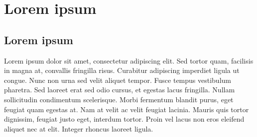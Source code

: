 \chapter{Lorem ipsum}

\section{Lorem ipsum}
Lorem ipsum dolor sit amet, consectetur adipiscing elit. Sed tortor quam, facilisis in magna at, convallis fringilla risus. Curabitur adipiscing imperdiet ligula ut congue. Nunc non urna sed velit aliquet tempor. Fusce tempus vestibulum pharetra. Sed laoreet erat sed odio cursus, et egestas lacus fringilla. Nullam sollicitudin condimentum scelerisque. Morbi fermentum blandit purus, eget feugiat quam egestas at. Nam at velit ac velit feugiat lacinia. Mauris quis tortor dignissim, feugiat justo eget, interdum tortor. Proin vel lacus non eros eleifend aliquet nec at elit. Integer rhoncus laoreet ligula.

